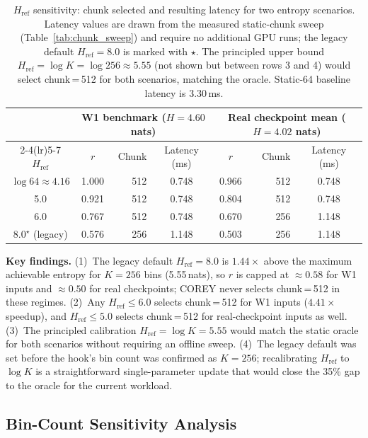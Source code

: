 \begin{table}[!t]
\centering
\caption{$H_{\text{ref}}$ sensitivity: chunk selected and resulting latency for two entropy scenarios. Latency values are drawn from the measured static-chunk sweep (Table~\ref{tab:chunk_sweep}) and require no additional GPU runs; the legacy default $H_{\text{ref}}{=}8.0$ is marked with $\star$. The principled upper bound $H_{\text{ref}}{=}\log K{=}\log 256{\approx}5.55$ (not shown but between rows 3 and 4) would select chunk\,=\,512 for both scenarios, matching the oracle. Static-64 baseline latency is 3.30\,ms.}
\label{tab:href_ablation}
\small
\begin{tabular}{ccrccrc}
\toprule
& \multicolumn{3}{c}{W1 benchmark ($H{=}4.60$ nats)} & \multicolumn{3}{c}{Real checkpoint mean ($H{=}4.02$ nats)} \\
\cmidrule(lr){2-4}\cmidrule(lr){5-7}
$H_{\text{ref}}$ & $r$ & Chunk & Latency (ms) & $r$ & Chunk & Latency (ms) \\
\midrule
$\log 64 \approx 4.16$ & 1.000 & 512 & 0.748 & 0.966 & 512 & 0.748 \\
5.0  & 0.921 & 512 & 0.748 & 0.804 & 512 & 0.748 \\
6.0  & 0.767 & 512 & 0.748 & 0.670 & 256 & 1.148 \\
8.0$^\star$ (legacy) & 0.576 & 256 & 1.148 & 0.503 & 256 & 1.148 \\
\bottomrule
\end{tabular}
\end{table}

\noindent\textbf{Key findings.}
(1)~The legacy default $H_{\text{ref}}{=}8.0$ is $1.44\times$ above the maximum achievable entropy for $K{=}256$ bins (5.55\,nats), so $r$ is capped at $\approx0.58$ for W1 inputs and $\approx0.50$ for real checkpoints; COREY never selects chunk\,=\,512 in these regimes.
(2)~Any $H_{\text{ref}}{\le}6.0$ selects chunk\,=\,512 for W1 inputs ($4.41\times$ speedup), and $H_{\text{ref}}{\le}5.0$ selects chunk\,=\,512 for real-checkpoint inputs as well.
(3)~The principled calibration $H_{\text{ref}}{=}\log K{=}5.55$ would match the static oracle for both scenarios without requiring an offline sweep.
(4)~The legacy default was set before the hook's bin count was confirmed as $K{=}256$; recalibrating $H_{\text{ref}}$ to $\log K$ is a straightforward single-parameter update that would close the 35\% gap to the oracle for the current workload.

\subsection{Bin-Count Sensitivity Analysis}
\label{sec:bin_count_sensitivity}

